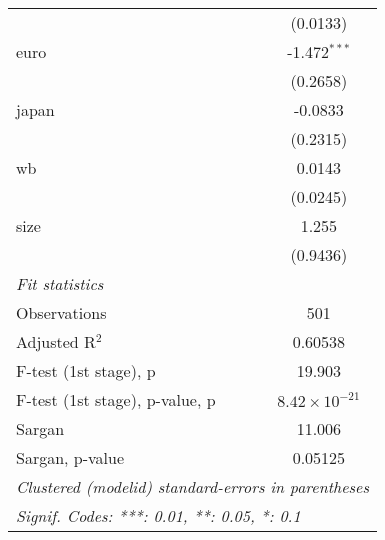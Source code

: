 \begin{tabular}{lc}
                                  & (0.0133)\\   
   euro                           & -1.472$^{***}$\\   
                                  & (0.2658)\\   
   japan                          & -0.0833\\   
                                  & (0.2315)\\   
   wb                             & 0.0143\\   
                                  & (0.0245)\\   
   size                           & 1.255\\   
                                  & (0.9436)\\   
   \midrule
   \emph{Fit statistics}\\
   Observations                   & 501\\  
   Adjusted R$^2$                 & 0.60538\\  
   F-test (1st stage), p          & 19.903\\  
   F-test (1st stage), p-value, p & $8.42\times 10^{-21}$\\   
   Sargan                         & 11.006\\  
   Sargan, p-value                & 0.05125\\  
   \midrule \midrule
   \multicolumn{2}{l}{\emph{Clustered (modelid) standard-errors in parentheses}}\\
   \multicolumn{2}{l}{\emph{Signif. Codes: ***: 0.01, **: 0.05, *: 0.1}}\\
\end{tabular}
\par\endgroup


